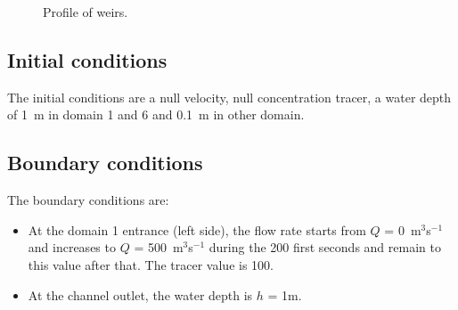 \begin{figure}[!htbp]
\begin{minipage}[t]{0.50\textwidth}
 \centering
\end{minipage}
\begin{minipage}[t]{0.50\textwidth}
 \centering
\end{minipage}
\begin{minipage}[t]{0.50\textwidth}
 \centering
\end{minipage}
\begin{minipage}[t]{0.50\textwidth}
 \centering
\end{minipage}
\begin{minipage}[t]{\textwidth}
 \centering
\end{minipage}
 \caption{Profile of weirs.}
 \label{t2d:weirs2:fig:weirsprofile}
\end{figure}

\newpage 
\subsection{Initial conditions}

The initial conditions are a null velocity, null concentration tracer,
a water depth of 1~m in domain 1 and 6 and 0.1~m in other domain.

\subsection{Boundary conditions}

The boundary conditions are:
\begin{itemize}
\item At the domain 1 entrance (left side), the flow rate starts from 
$Q$ = 0~m$^3$s$^{-1}$ and increases to $Q$ = 500~m$^3$s$^{-1}$
during the 200 first seconds and remain to this value after that.
The tracer value is 100.
\item At the channel outlet, the water depth is $h$ = 1m.
\end{itemize}

